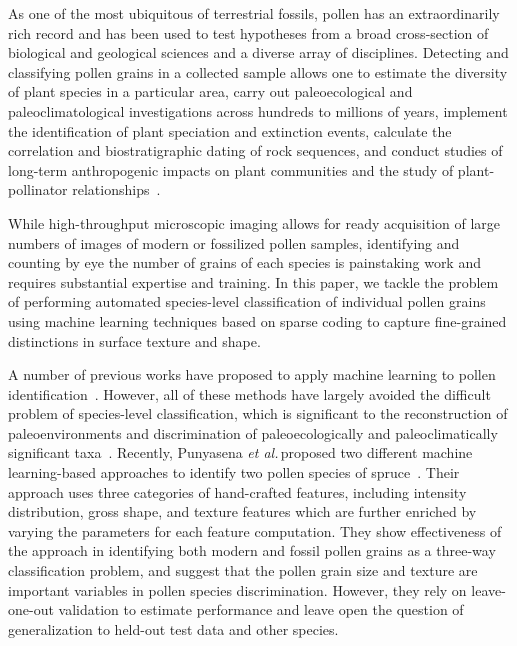 \documentclass[10pt,twocolumn,letterpaper]{article}
\def\etal{{\em et al.\/}\,}
\begin{document}
As one of the most ubiquitous of terrestrial fossils, pollen has an
extraordinarily rich record and has been used to test hypotheses from a broad
cross-section of biological and geological sciences and a diverse array of
disciplines.  Detecting and classifying pollen grains in a collected sample
allows one to estimate the diversity of plant species in a particular area,
carry out paleoecological and paleoclimatological investigations across
hundreds to millions of years, implement the identification of plant speciation
and extinction events, calculate the correlation and biostratigraphic dating of
rock sequences, and conduct studies of long-term anthropogenic impacts on plant
communities and the study of plant-pollinator
relationships~\cite{punyasena2012classifying}.



While high-throughput microscopic imaging allows for ready acquisition of large
numbers of images of modern or fossilized pollen samples, identifying and
counting by eye the number of grains of each species is painstaking work and
requires substantial expertise and training. In this paper, we tackle the
problem of performing automated species-level classification of individual
pollen grains using machine learning techniques based on sparse coding to
capture fine-grained distinctions in surface texture and shape.

A number of previous works have proposed to apply machine learning to pollen
identification~\cite{langford1990computerized,li1999pollen,france2000new,ronneberger2002automated,li2004towards,treloar2004towards,zhang2004towards,chen2006feasibility,dell2009pollen,landsmeer2009detection,holt2011progress}.
However,
all of these methods have largely avoided the difficult problem of species-level classification,
which is significant to the reconstruction of paleoenvironments and discrimination of paleoecologically and paleoclimatically significant taxa~\cite{punyasena2012classifying}.
Recently,
Punyasena \etal proposed two different machine learning-based approaches to identify two pollen species of spruce~\cite{punyasena2012classifying,tcheng2016visual}.
Their approach uses three categories of hand-crafted features,
including intensity distribution, gross shape, and texture features
which are further enriched by varying the parameters for each feature computation.
They show effectiveness of the approach in identifying both modern and fossil pollen grains as a three-way classification problem,
and suggest that the pollen grain size and texture are important variables in pollen species discrimination.
However, they rely on leave-one-out validation to estimate performance and leave open the
question of generalization to held-out test data and other species.
\end{document}
